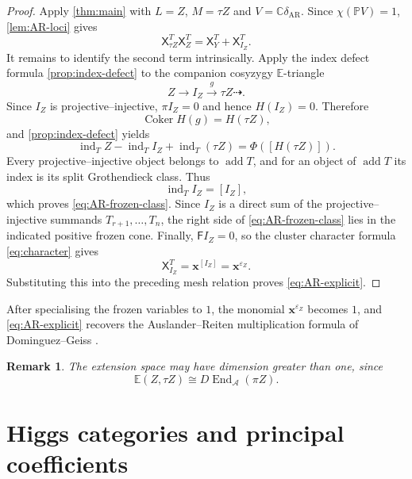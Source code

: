 \documentclass[11pt,reqno]{article}
\numberwithin{equation}{section}
\newtheorem{remark}[remark]{Remark}
\theoremstyle{definition}
\DeclareMathOperator{\add}{add}
\DeclareMathOperator{\End}{End}
\DeclareMathOperator{\Coker}{Coker}
\DeclareMathOperator{\ind}{ind}
\newcommand{\A}{\mathcal A}
\newcommand{\E}{\mathbb E}
\newcommand{\F}{\mathsf F}
\newcommand{\X}{\mathsf X}
\newcommand{\kk}{\mathbb C}
\newcommand{\xto}[1]{\xrightarrow{#1}}
\newcommand{\bx}{\mathbf x}
\begin{document}
\begin{proof}
Apply \cref{thm:main} with $L=Z$, $M=\tau Z$ and
$V=\kk\delta_{\mathrm{AR}}$.  Since $\chi(\mathbb PV)=1$, \cref{lem:AR-loci} gives
\[
 \X^T_{\tau Z}\X^T_Z=\X^T_Y+\X^T_{I_Z}.
\]
It remains to identify the second term intrinsically.  Apply the index defect formula \cref{prop:index-defect} to the companion cosyzygy $\E$-triangle
\[
 Z\longrightarrow I_Z\xto{g}\tau Z\dashrightarrow.
\]
Since $I_Z$ is projective--injective, $\pi I_Z=0$ and hence $H(I_Z)=0$.  Therefore
\[
 \Coker H(g)=H(\tau Z),
\]
and \cref{prop:index-defect} yields
\[
 \ind_T Z-\ind_T I_Z+\ind_T(\tau Z)
 =\Phi([H(\tau Z)]).
\]
Every projective--injective object belongs to $\add T$, and for an object of $\add T$ its index is its split Grothendieck class.  Thus
\[
 \ind_T I_Z=[I_Z],
\]
which proves \eqref{eq:AR-frozen-class}.  Since $I_Z$ is a direct sum of the projective--injective summands $T_{r+1},\ldots,T_n$, the right side of \eqref{eq:AR-frozen-class} lies in the indicated positive frozen cone.  Finally, $\F I_Z=0$, so the cluster character formula \eqref{eq:character} gives
\[
 \X^T_{I_Z}=\bx^{[I_Z]}=\bx^{\varepsilon_Z}.
\]
Substituting this into the preceding mesh relation proves \eqref{eq:AR-explicit}.
\end{proof}

After specialising the frozen variables to $1$, the monomial $\bx^{\varepsilon_Z}$ becomes $1$, and \eqref{eq:AR-explicit} recovers the Auslander--Reiten multiplication formula of Dominguez--Geiss \cite{DominguezGeiss}.

\begin{remark}
The extension space may have dimension greater than one, since
\[
 \E(Z,\tau Z)\cong D\End_{\A}(\pi Z).
\]
\end{remark}

\section{Higgs categories and principal coefficients}\label{Higgs}
\end{document}
